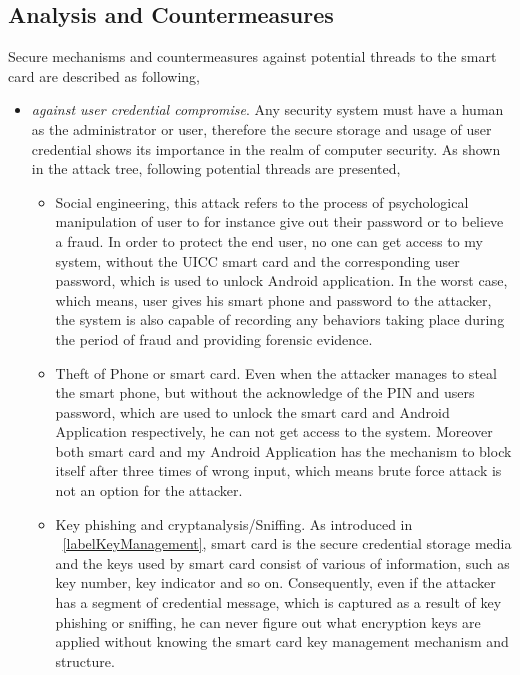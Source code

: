 \subsection{Analysis and Countermeasures}
Secure mechanisms and countermeasures against potential threads to the smart card are described as following,
\begin{itemize}
\item \emph{against user credential compromise}. Any security system must have a human as the administrator or user, therefore the secure storage and usage of user credential shows its importance in the realm of computer security. As shown in the attack tree, following potential threads are presented,
\begin{itemize}
\item Social engineering, this attack refers to the process of psychological manipulation of user to for instance give out their password or to believe a fraud. In order to protect the end user, no one can get access to my system, without the UICC smart card and the corresponding user password, which is used to unlock Android  application. In the worst case, which means, user gives his smart phone and password to the attacker, the system is also capable of recording any behaviors taking place during the period of fraud and providing forensic evidence.
\item Theft of Phone or smart card. Even when the attacker manages to steal the smart phone, but without the acknowledge of the PIN and users password, which are used to unlock the smart card and Android Application respectively, he can not get access to the system. Moreover both smart card and my Android Application has the mechanism to block itself after three times of wrong input, which means brute force attack is not an option for the attacker.
\item Key phishing and cryptanalysis/Sniffing. As introduced in ~\ref{labelKeyManagement}, smart card is the secure  credential  storage media and the keys used by smart card consist of various of information, such as key number, key indicator and so on. Consequently, even if the attacker has a segment of credential message, which is captured as a result of key phishing or sniffing, he can never figure out what encryption keys are applied without knowing the smart card key management mechanism and structure.
\end{itemize}

\end{itemize}
